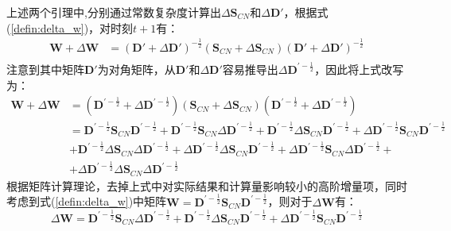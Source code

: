 上述两个引理中,分别通过常数复杂度计算出$\Delta\textbf{S}_{CN}$和$\Delta\textbf{D}'$，根据式(\ref{defin:delta_w})，对时刻$t+1$有：
\begin{equation}
	\begin{aligned}
	\textbf{W} + \Delta\textbf{W} &= (\textbf{D}'+\Delta\textbf{D}')^{-\frac{1}{2}}(\textbf{S}_{CN}+\Delta\textbf{S}_{CN})(\textbf{D}'+\Delta\textbf{D}')^{-\frac{1}{2}} \\	
	\end{aligned}
\end{equation}
注意到其中矩阵$\textbf{D}'$为对角矩阵，从$\textbf{D}'$和$\Delta\textbf{D}'$容易推导出$\Delta\textbf{D}^{\prime-\frac{1}{2}}$，因此将上式改写为：
\begin{equation}
	\begin{aligned}
	\textbf{W} + \Delta\textbf{W} &= (\textbf{D}^{\prime-\frac{1}{2}}+\Delta\textbf{D}^{\prime-\frac{1}{2}})(\textbf{S}_{CN}+\Delta\textbf{S}_{CN})(\textbf{D}^{\prime-\frac{1}{2}}+\Delta\textbf{D}^{\prime-\frac{1}{2}}) \\	
	& = \textbf{D}^{\prime-\frac{1}{2}}\textbf{S}_{CN}\textbf{D}^{\prime-\frac{1}{2}}+
	\textbf{D}^{\prime-\frac{1}{2}}\textbf{S}_{CN}\Delta\textbf{D}^{\prime-\frac{1}{2}}+
	\textbf{D}^{\prime-\frac{1}{2}}\Delta\textbf{S}_{CN}\textbf{D}^{\prime-\frac{1}{2}}+
	\Delta\textbf{D}^{\prime-\frac{1}{2}}\textbf{S}_{CN}\textbf{D}^{\prime-\frac{1}{2}}\\
	&+\textbf{D}^{\prime-\frac{1}{2}}\Delta\textbf{S}_{CN}\Delta\textbf{D}^{\prime-\frac{1}{2}}+
	\Delta\textbf{D}^{\prime-\frac{1}{2}}\Delta\textbf{S}_{CN}\textbf{D}^{\prime-\frac{1}{2}}+
	\Delta\textbf{D}^{\prime-\frac{1}{2}}\textbf{S}_{CN}\Delta\textbf{D}^{\prime-\frac{1}{2}}+\\
	&+\Delta\textbf{D}^{\prime-\frac{1}{2}}\Delta\textbf{S}_{CN}\Delta\textbf{D}^{\prime-\frac{1}{2}}
	\end{aligned}
\end{equation}
根据矩阵计算理论\cite{golub2012matrix}，去掉上式中对实际结果和计算量影响较小的高阶增量项，同时考虑到式(\ref{defin:delta_w})中矩阵$\textbf{W}= \textbf{D}^{\prime-\frac{1}{2}}\textbf{S}_{CN}\textbf{D}^{\prime-\frac{1}{2}}$，则对于$\Delta\textbf{W}$有：
\begin{equation}
	\Delta\textbf{W}= \textbf{D}^{\prime-\frac{1}{2}}\textbf{S}_{CN}\Delta\textbf{D}^{\prime-\frac{1}{2}}+
	\textbf{D}^{\prime-\frac{1}{2}}\Delta\textbf{S}_{CN}\textbf{D}^{\prime-\frac{1}{2}}+
	\Delta\textbf{D}^{\prime-\frac{1}{2}}\textbf{S}_{CN}\textbf{D}^{\prime-\frac{1}{2}}
\end{equation}
